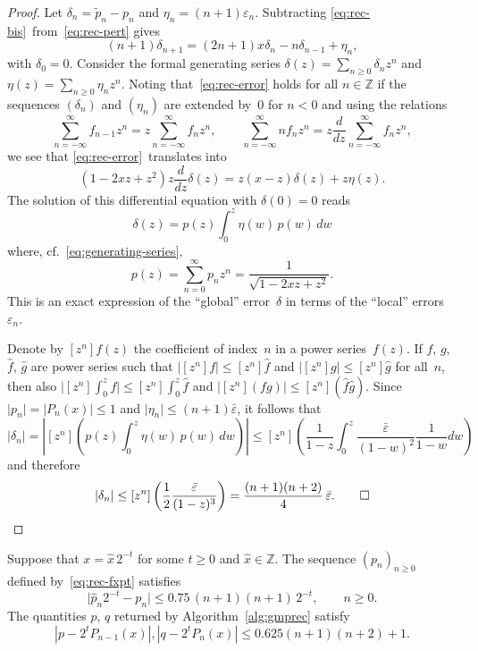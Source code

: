 \documentclass{siamart0216}
\newcommand{\abs}[1]{\mathopen| #1 \mathclose|}
\newcommand{\ddz}{\frac{d}{dz}}
\begin{document}
\begin{proof}
Let
$\delta_n = \tilde{p}_n - p_n$
and
$\eta_n = (n + 1) \varepsilon_n$.
Subtracting \eqref{eq:rec-bis} from \eqref{eq:rec-pert} gives
\begin{equation} \label{eq:rec-error}
  (n + 1) \delta_{n + 1}
  = (2 n + 1) x \delta_n - n \delta_{n - 1} + \eta_n,
\end{equation}
with $\delta_0 = 0$.
Consider the formal generating series
$\delta(z) = \sum_{n \geq 0} \delta_n z^n$
and
$\eta(z) = \sum_{n \geq 0} \eta_n z^n$.
Noting that \eqref{eq:rec-error} holds for all $n \in \mathbb{Z}$ if
the sequences $(\delta_n)$ and $(\eta_n)$ are extended by~$0$ for
$n < 0$
and using the relations
\[
  \sum_{n=-\infty}^{\infty} f_{n - 1} z^n
  = z \sum_{n=-\infty}^{\infty} f_n z^n,
  \qquad
  \sum_{n=-\infty}^{\infty} n f_{n} z^n
  = z \ddz \sum_{n=-\infty}^{\infty} f_n z^n,
\]
we see that \eqref{eq:rec-error} translates into
\[ (1 - 2 xz + z^2) z \ddz \delta (z)
   = z (x - z) \delta (z) + z \eta (z). \]
The solution of this differential equation with $\delta (0) = 0$ reads
\[ \delta(z) = p(z)  \int_0^z \eta(w) \, p(w) \, dw \]
where, cf. \eqref{eq:generating-series},
\[ p(z) = \sum_{n=0}^{\infty} p_n z^n
        = \frac{1}{\sqrt{1 - 2 xz + z^2}}. \]
This is an exact expression of the ``global'' error $\delta$ in terms
of the ``local'' errors~$\varepsilon_n$.

Denote by $[z^n] f(z)$ the coefficient of index $n$ in a power
series $f(z)$.
If $f$, $g$, $\hat f$, $\hat g$ are power series such that
$\abs{[z^n] f} \leq [z^n] \hat f$ and
$\abs{[z^n] g} \leq [z^n] \hat g$
for all $n$, then also
$\abs{[z^n] \int_0^z f} \leq [z^n] \int_0^z \hat f$ and
$\abs{[z^n] (fg)} \leq [z^n] (\hat f \hat g)$.
Since $\abs{p_n} = \abs{P_n(x)} \leq 1$
and $\abs{\eta_n} \leq (n+1) \bar \varepsilon$,
it follows that
\[
  \abs{\delta_n}
  = \left| [z^n] \left( p(z)  \int_0^z \eta(w) \, p(w) \, dw \right) \right|
  \leq [z^n] \left(
    \frac{1}{1-z}
    \int_0^z \frac{\bar \varepsilon}{(1 - w)^2} \frac{1}{1-w} dw \right)
\]
and therefore
\[
  \abs{\delta_n}
  \leq [z^n] \left( \frac12 \frac{\bar \varepsilon}{(1-z)^3} \right)
  = \frac{(n+1)(n+2)}{4} \, \bar \varepsilon. \qed
\]
\end{proof}

\begin{corollary}
Suppose that $x = \hat x \, 2^{-t}$ for some $t \geq 0$ and
$\hat x \in \mathbb Z$.
The sequence $(p_n)_{n \geq 0}$ defined by \eqref{eq:rec-fxpt}
satisfies
\[
  \abs{ \hat p_n 2^{-t} - p_n }
  \leq 0.75 \, (n+1) (n+1) \, 2^{-t},
  \qquad
  n \geq 0.
\]
The quantities $p$, $q$ returned by Algorithm~\ref{alg:gmprec}
satisfy
\begin{equation} \label{eq:bound-gmprec}
  |p - 2^t P_{n-1}(x)|, |q - 2^t P_{n}(x)|
  \le 0.625 (n+1)(n+2) + 1.
\end{equation}
\end{corollary}
\end{document}
